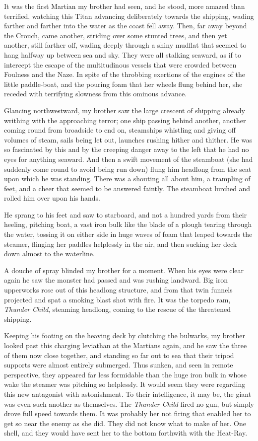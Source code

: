 It was the first Martian my brother had seen, and he stood, more
amazed than terrified, watching this Titan advancing deliberately
towards the shipping, wading farther and farther into the water as
the coast fell away. Then, far away beyond the Crouch, came
another, striding over some stunted trees, and then yet another,
still farther off, wading deeply through a shiny mudflat that
seemed to hang halfway up between sea and sky. They were all
stalking seaward, as if to intercept the escape of the
multitudinous vessels that were crowded between Foulness and the
Naze. In spite of the throbbing exertions of the engines of the
little paddle-boat, and the pouring foam that her wheels flung
behind her, she receded with terrifying slowness from this ominous
advance.

Glancing northwestward, my brother saw the large crescent of
shipping already writhing with the approaching terror; one ship
passing behind another, another coming round from broadside to end
on, steamships whistling and giving off volumes of steam, sails
being let out, launches rushing hither and thither. He was so
fascinated by this and by the creeping danger away to the left that
he had no eyes for anything seaward. And then a swift movement of
the steamboat (she had suddenly come round to avoid being run down)
flung him headlong from the seat upon which he was standing. There
was a shouting all about him, a trampling of feet, and a cheer that
seemed to be answered faintly. The steamboat lurched and rolled him
over upon his hands.

He sprang to his feet and saw to starboard, and not a hundred yards
from their heeling, pitching boat, a vast iron bulk like the blade
of a plough tearing through the water, tossing it on either side in
huge waves of foam that leaped towards the steamer, flinging her
paddles helplessly in the air, and then sucking her deck down
almost to the waterline.

A douche of spray blinded my brother for a moment. When his eyes
were clear again he saw the monster had passed and was rushing
landward. Big iron upperworks rose out of this headlong structure,
and from that twin funnels projected and spat a smoking blast shot
with fire. It was the torpedo ram, \emph{Thunder Child}, steaming
headlong, coming to the rescue of the threatened shipping.

Keeping his footing on the heaving deck by clutching the bulwarks,
my brother looked past this charging leviathan at the Martians
again, and he saw the three of them now close together, and
standing so far out to sea that their tripod supports were almost
entirely submerged. Thus sunken, and seen in remote perspective,
they appeared far less formidable than the huge iron bulk in whose
wake the steamer was pitching so helplessly. It would seem they
were regarding this new antagonist with astonishment. To their
intelligence, it may be, the giant was even such another as
themselves. The \emph{Thunder Child} fired no gun, but simply drove
full speed towards them. It was probably her not firing that
enabled her to get so near the enemy as she did. They did not know
what to make of her. One shell, and they would have sent her to the
bottom forthwith with the Heat-Ray.

